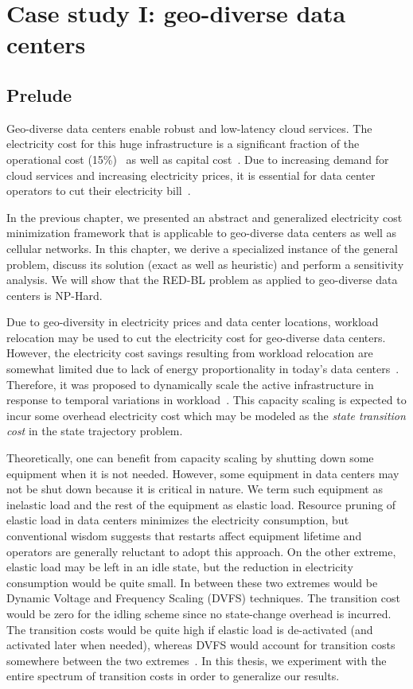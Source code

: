 \chapter{Case study I: geo-diverse data centers}
\label{chap:casestudy1}
\section{Prelude}
Geo-diverse data centers enable robust and low-latency cloud services. The electricity cost for this huge infrastructure is a significant fraction of the operational cost (15\%)~\cite{costCloud} as well as capital cost~\cite{qureshiHotnets}. Due to increasing demand for cloud services and increasing electricity prices, it is essential for data center operators to cut their electricity bill~\cite{brill:DataCenterCrisis:UI:2007,Belady_EC_2007}.

In the previous chapter, we presented an abstract and generalized electricity cost minimization framework that is applicable to geo-diverse data centers as well as cellular networks. In this chapter, we derive a specialized instance of the general problem, discuss its solution (exact as well as heuristic) and perform a sensitivity analysis.  We will show that the RED-BL problem as applied to geo-diverse data centers is NP-Hard. 

Due to geo-diversity in electricity prices and data center locations, workload relocation may be used to cut the electricity cost for geo-diverse data centers. However, the electricity cost savings resulting from workload relocation are somewhat limited due to lack of energy proportionality in today's data centers~\cite{10.1109/MC.2007.443}. Therefore, it was proposed to dynamically scale the active infrastructure in response to temporal variations in workload~\cite{10.1109/MC.2007.443,qureshi2009cutting}. This capacity scaling is expected to incur some overhead electricity cost which may be modeled as the \textit{state transition cost} in the state trajectory problem. 

Theoretically, one can benefit from capacity scaling by shutting down some equipment when it is not needed. However, some equipment in data centers may not be shut down because it is critical in nature. We term such equipment as inelastic load and the rest of the equipment as elastic load. Resource pruning of elastic load in data centers minimizes the electricity consumption, but conventional wisdom suggests that restarts affect equipment lifetime and operators are generally reluctant to adopt this approach. On the other extreme, elastic load may be left in an idle state, but the reduction in electricity  consumption would be quite small. In between these two extremes would be Dynamic Voltage and Frequency Scaling (DVFS) techniques. The transition cost would be zero for the idling scheme since no state-change overhead is incurred. The transition costs would be quite high if elastic load is de-activated (and activated later when needed), whereas DVFS would account for transition costs somewhere between the two extremes~\cite{Meisner:2009:PES:1508244.1508269}. In this thesis, we experiment with the entire spectrum of transition costs in order to generalize our results.

